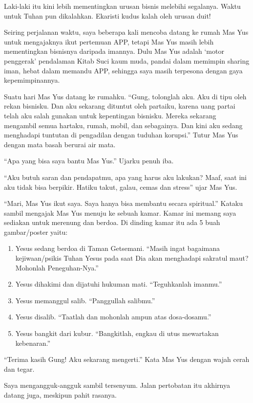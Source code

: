  	Laki-laki itu kini lebih mementingkan urusan bisnis melebihi segalanya. Waktu untuk Tuhan pun dikalahkan. Ekaristi kudus kalah oleh urusan duit!

Seiring perjalanan waktu, saya beberapa kali mencoba datang ke rumah Mas Yus untuk mengajaknya ikut pertemuan APP, tetapi Mas Yus masih lebih mementingkan bisnisnya daripada imannya. Dulu Mas Yus adalah `motor penggerak' pendalaman Kitab Suci kaum muda, pandai dalam memimpin sharing iman, hebat dalam memandu APP, sehingga saya masih terpesona dengan gaya kepemimpinannya.

\normalsize
Suatu hari Mas Yus datang ke rumahku. ``Gung, tolonglah aku. Aku di tipu oleh rekan bisnisku. Dan aku sekarang dituntut oleh partaiku, karena uang partai telah aku salah gunakan untuk kepentingan bisnisku. Mereka sekarang mengambil semua hartaku, rumah, mobil, dan sebagainya. Dan kini aku sedang menghadapi tuntutan di pengadilan dengan tuduhan korupsi.'' Tutur Mas Yus dengan mata basah berurai air mata.

``Apa yang bisa saya bantu Mas Yus.'' Ujarku penuh iba.

``Aku butuh saran dan pendapatmu, apa yang harus aku lakukan? Maaf, saat ini aku tidak bisa berpikir. Hatiku takut, galau, cemas dan stress'' ujar Mas Yus.


``Mari, Mas Yus ikut saya. Saya hanya bisa membantu secara spiritual.'' Kataku sambil mengajak Mas Yus menuju ke sebuah kamar. Kamar ini memang saya sediakan untuk merenung dan berdoa.  Di dinding kamar itu ada 5 buah gambar/poster yaitu:
\begin{enumerate}
\item Yesus sedang berdoa di Taman Getsemani. ``Masih ingat bagaimana kejiwaan/psikis Tuhan Yesus pada saat Dia akan menghadapi sakratul maut? Mohonlah Peneguhan-Nya.''
\item Yesus dihakimi dan dijatuhi hukuman mati. ``Teguhkanlah imanmu.''
\item Yesus memanggul salib. ``Panggullah salibmu.''
\item Yesus disalib. ``Taatlah dan mohonlah ampun atas dosa-dosamu.''
\item Yesus bangkit dari kubur. ``Bangkitlah, engkau di utus mewartakan kebenaran.''
\end{enumerate}

``Terima kasih Gung! Aku sekarang mengerti.'' Kata Mas Yus dengan wajah cerah dan tegar.

Saya mengangguk-angguk sambil tersenyum. Jalan pertobatan itu akhirnya datang juga, meskipun pahit rasanya. 
	

